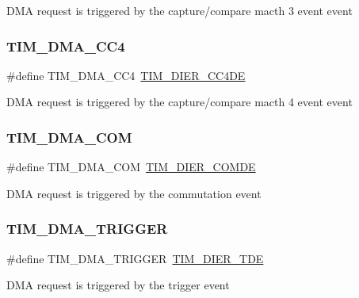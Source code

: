 D\+MA request is triggered by the capture/compare macth 3 event event \mbox{\label{group___t_i_m___d_m_a__sources_ga59495cf79894dfe5e5b2029863aed956}} 
\subsubsection{\texorpdfstring{TIM\_DMA\_CC4}{TIM\_DMA\_CC4}}
{\footnotesize\ttfamily \#define T\+I\+M\+\_\+\+D\+M\+A\+\_\+\+C\+C4~\mbox{\hyperlink{group___peripheral___registers___bits___definition_gaaba034412c54fa07024e516492748614}{T\+I\+M\+\_\+\+D\+I\+E\+R\+\_\+\+C\+C4\+DE}}}

D\+MA request is triggered by the capture/compare macth 4 event event \mbox{\label{group___t_i_m___d_m_a__sources_gac5f4c56e944bda8ba0c23b97275020ba}} 
\subsubsection{\texorpdfstring{TIM\_DMA\_COM}{TIM\_DMA\_COM}}
{\footnotesize\ttfamily \#define T\+I\+M\+\_\+\+D\+M\+A\+\_\+\+C\+OM~\mbox{\hyperlink{group___peripheral___registers___bits___definition_ga79c3fab9d33de953a0a7f7d6516c73bc}{T\+I\+M\+\_\+\+D\+I\+E\+R\+\_\+\+C\+O\+M\+DE}}}

D\+MA request is triggered by the commutation event \mbox{\label{group___t_i_m___d_m_a__sources_ga21912fd910242e0f63bf9b0953e41c63}} 
\subsubsection{\texorpdfstring{TIM\_DMA\_TRIGGER}{TIM\_DMA\_TRIGGER}}
{\footnotesize\ttfamily \#define T\+I\+M\+\_\+\+D\+M\+A\+\_\+\+T\+R\+I\+G\+G\+ER~\mbox{\hyperlink{group___peripheral___registers___bits___definition_ga5a752d4295f100708df9b8be5a7f439d}{T\+I\+M\+\_\+\+D\+I\+E\+R\+\_\+\+T\+DE}}}

D\+MA request is triggered by the trigger event \mbox{\label{group___t_i_m___d_m_a__sources_ga45816ad15a4f533027eb202ac0b9aaf5}} 

